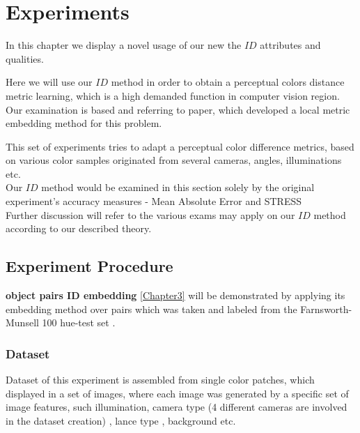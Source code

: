 
\chapter{Experiments} %

\label{Chapter8}

In this chapter we display a novel usage of our new the $ID$ attributes and qualities.

Here we will use our $ID$ method in order to obtain a perceptual colors distance metric learning, which is a high demanded function in computer vision region. Our examination is based and referring to \cite{perp_color} paper, which developed a local metric embedding method for this problem. 

This set of experiments tries to adapt a perceptual color difference metrics, based on various color samples originated from several cameras, angles, illuminations etc.
\\

Our $ID$ method would be examined in this section solely by the original experiment's accuracy measures - Mean Absolute Error \cite{MAE} and STRESS \cite{STRESS}
\\
Further discussion will refer to the various exams may apply on our $ID$ method according to our described theory.

\section{Experiment Procedure}



\textbf{object pairs ID embedding} \ref{Chapter3} will be demonstrated by applying its embedding method over pairs which was taken and labeled from the Farnsworth-Munsell 100 hue-test set \cite{furnsworth}.
\subsection{Dataset}

Dataset of this experiment is assembled from single color patches, which displayed in a set of images, where each image was generated by a specific set of image features, such illumination, camera type (4 different cameras are involved in the dataset creation) , lance type , background etc.

